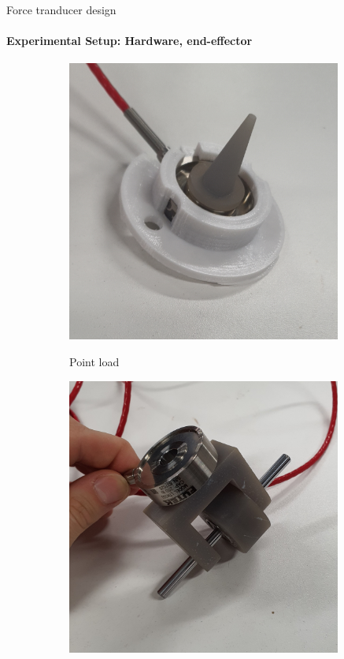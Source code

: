 \documentclass[aspectratio=169]{beamer}
\begin{document}
\begin{frame}[t]{Force tranducer design}
    \framesubtitle{Experimental Setup: Hardware, end-effector}
    \begin{figure}[H]
        \begin{subfigure}[b]{0.29\textwidth}
            \centering\includegraphics[width=0.99\textwidth]{point_load.JPG}\\
            \caption{Point load}
            \label{fig:point_load}
        \end{subfigure}
        \begin{subfigure}[b]{0.29\textwidth}
            \centering\includegraphics[width=0.99\textwidth]{rolling_load.JPG}\\

\end{subfigure}
\end{figure}
\end{frame}
\end{document}

